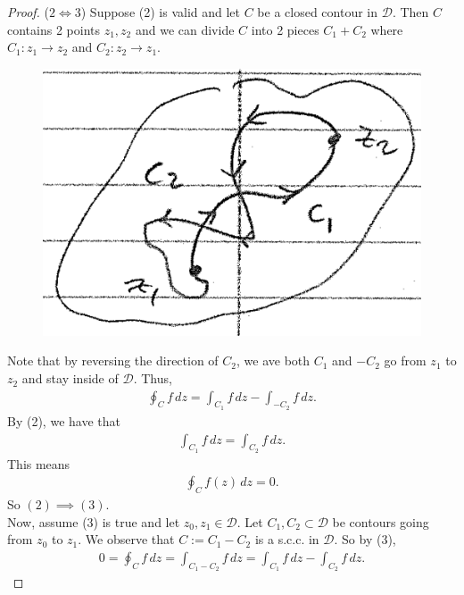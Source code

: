 \documentclass{article}
\theoremstyle{definition}
\begin{document}
\begin{proof}
	($2\iff 3$) Suppose (2) is valid and let $C$ be a closed contour in $\mathcal{D}$. Then $C$ contains 2 points $z_1,z_2$ and we can divide $C$ into 2 pieces $C_1 + C_2$ where $C_1: z_1 \to z_2$ and $C_2: z_2 \to z_1$.
	
	\begin{figure}[!htb]
		\centering
		\includegraphics[scale=0.25]{c1c2}
	\end{figure}

	Note that by reversing the direction of $C_2$, we ave both $C_1$ and $-C_2$ go from $z_1$ to $z_2$ and stay inside of $\mathcal{D}$. Thus, 
	\begin{align}
	\oint_{C}f\,dz = \int_{C_1} f\,dz - \int_{-C_2}f\,dz.
	\end{align}
	By (2), we have that
	\begin{align}
	\int_{C_1} f\,dz = \int_{C_2}f\,dz.
	\end{align}
	This means 
	\begin{align}
	\oint_C f(z)\,dz = 0.
	\end{align}
	So $(2) \implies (3)$.\\
	
	Now, assume (3) is true and let $z_0, z_1 \in \mathcal{D}$. Let $C_1, C_2 \subset \mathcal{D}$ be contours going from $z_0$ to $z_1$. We observe that $C:= C_1 - C_2$ is a s.c.c. in $\mathcal{D}$. So by (3),
	\begin{align}
	0 = \oint_C f\,dz = \int_{C_1 - C_2}f\,dz = \int_{C_1} f\,dz - \int_{C_2}f\,dz.
	\end{align}	
	
	
	

\end{proof}
\end{document}
